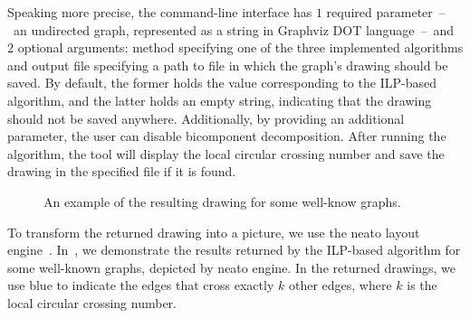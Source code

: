 Speaking more precise, the command-line interface has \(1\) required parameter~--~an undirected graph, represented as a string in Graphviz \textsc{DOT} language~--~and \(2\) optional arguments: method specifying one of the three implemented algorithms and output file specifying a path to file in which the graph's drawing should be saved. By default, the former holds the value corresponding to the ILP-based algorithm, and the latter holds an empty string, indicating that the drawing should not be saved anywhere. Additionally, by providing an additional parameter, the user can disable bicomponent decomposition. After running the algorithm, the tool will display the local circular crossing number and save the drawing in the specified file if it is found.

\begin{figure}
    \centering
    \hfill
    \hfill
    \caption{An example of the resulting drawing for some well-know graphs.}
    \label{fig:demo}
\end{figure}

To transform the returned drawing into a picture, we use the \textsf{neato} layout engine~\cite{neato}. In~, we demonstrate the results returned by the ILP-based algorithm for some well-known graphs, depicted by \textsf{neato} engine. In the returned drawings, we use blue to indicate the edges that cross exactly \(k\) other edges, where \(k\) is the local circular crossing number.
